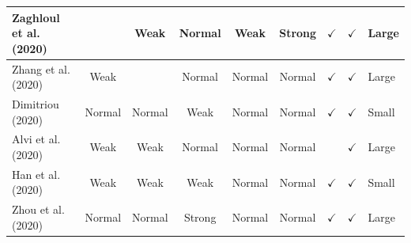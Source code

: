 \documentclass[../access.tex]{subfiles}
\begin{document}
\begin{table}[htbp]
\begin{adjustwidth}{-2cm}{}
\begin{tabular}{m{4.4cm} c c c c c c c >{\centering\arraybackslash}m{0.7cm}}
            \hline
            \footnotesize{Zaghloul et al. (2020) \cite{Zaghloul2020}}      & {}                                                                                          & {Weak}                                           & {Normal}               & {Weak}                       & {Strong}                  & $ \checkmark $          & $ \checkmark $            & \footnotesize{Large} \\
            \hline
            \footnotesize{Zhang et al. (2020) \cite{Zhang2020}}            & {Weak}                                                                                      & {}                                               & {Normal}               & {Normal}                     & {Normal}                  & $ \checkmark $          & $ \checkmark $            & \footnotesize{Large} \\
            \hline
            \footnotesize{Dimitriou (2020) \cite{Dimitriou2020}}           & {Normal}                                                                                    & {Normal}                                         & {Weak}                 & {Normal}                     & {Normal}                  & $ \checkmark $          & $ \checkmark $            & \footnotesize{Small} \\
            \hline
            \footnotesize{Alvi et al. (2020) \cite{Alvi2020}}              & {Weak}                                                                                      & {Weak}                                           & {Normal}               & {Normal}                     & {Normal}                  & {}                      & $ \checkmark $            & \footnotesize{Large} \\
            \hline
            \footnotesize{Han et al. (2020) \cite{Han2020}}                & {Weak}                                                                                      & {Weak}                                           & {Weak}                 & {Normal}                     & {Normal}                  & $ \checkmark $          & $ \checkmark $            & \footnotesize{Small} \\
            \hline
            \footnotesize{Zhou et al. (2020) \cite{Zhou2020}}              & {Normal}                                                                                    & {Normal}                                         & {Strong}               & {Normal}                     & {Normal}                  & $ \checkmark $          & $ \checkmark $            & \footnotesize{Large} \\

\end{tabular}
\end{adjustwidth}
\end{table}
\end{document}
